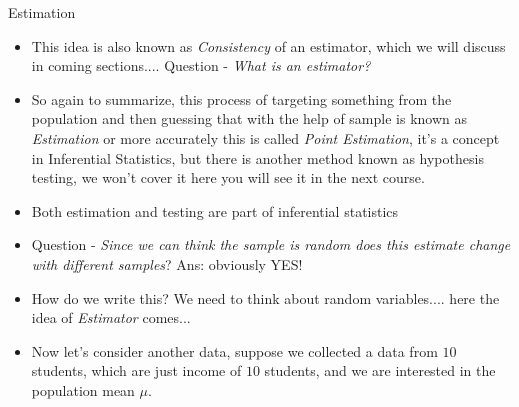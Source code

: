 \documentclass[8pt, usepdftitle=false]{beamer}
\begin{document}
\begin{frame}[allowframebreaks]{Estimation}
\begin{itemize}
   \item This idea is also known as \emph{Consistency} of an \alert{estimator}, which we will discuss in coming sections.... Question - \emph{What is an estimator?}

     \framebreak

  \item So again to summarize, this process of targeting something from the population and then guessing that with the help of sample is known as \emph{Estimation} or more accurately this is called \emph{Point Estimation}, it's a concept in Inferential Statistics, but there is another method known as hypothesis testing, we won't cover it here you will see it in the next course.

  \item Both estimation and testing are part of inferential statistics




\item Question  - \emph{Since we can think the sample is random does this estimate change with different samples}? Ans: obviously YES!

\item How do we write this? We need to think about random variables.... here the idea of \emph{Estimator} comes...

 \framebreak


\item Now let's consider another data, suppose we collected a data from $10$ students, which are just income of $10$ students, and we are interested in the population mean $\mu$.



\end{itemize}
\end{frame}
\end{document}

